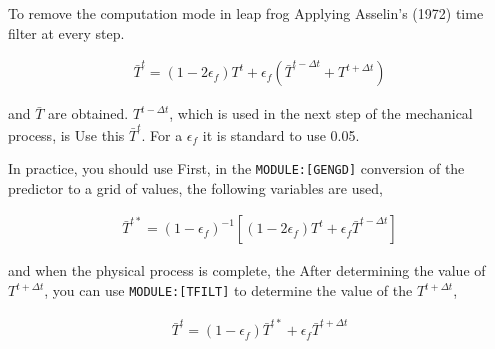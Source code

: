 To remove the computation mode in leap frog Applying Asselin's (1972)
time filter at every step.

\begin{eqnarray}
  \bar{T}^{t}
    = ( 1-2 \epsilon_f ) T^{t}
    +  \epsilon_f 
        \left( \bar{T}^{t-\Delta t} + T^{t+\Delta t} \right)
\end{eqnarray}

and \(\bar{T}\) are obtained. \(T^{t-\Delta t}\), which is used in the
next step of the mechanical process, is Use this \(\bar{T}^t\). For a
\(\epsilon_f\) it is standard to use 0.05.

In practice, you should use First, in the \texttt{MODULE:{[}GENGD{]}}
conversion of the predictor to a grid of values, the following variables
are used,

\begin{eqnarray}
  \bar{T}^{t*}
    = ( 1 -\epsilon_f )^{-1} 
     \left[ ( 1-2 \epsilon_f ) T^{t} + \epsilon_f \bar{T}^{t-\Delta t}
     \right]
\end{eqnarray}

and when the physical process is complete, the After determining the
value of \(T^{t+\Delta t}\), you can use \texttt{MODULE:{[}TFILT{]}} to
determine the value of the \(T^{t+\Delta t}\),

\begin{eqnarray}
 \bar{T}^{t}
    = ( 1 -\epsilon_f ) \bar{T}^{t*}  
       +  \epsilon_f \bar{T}^{t+\Delta t}
\end{eqnarray}
